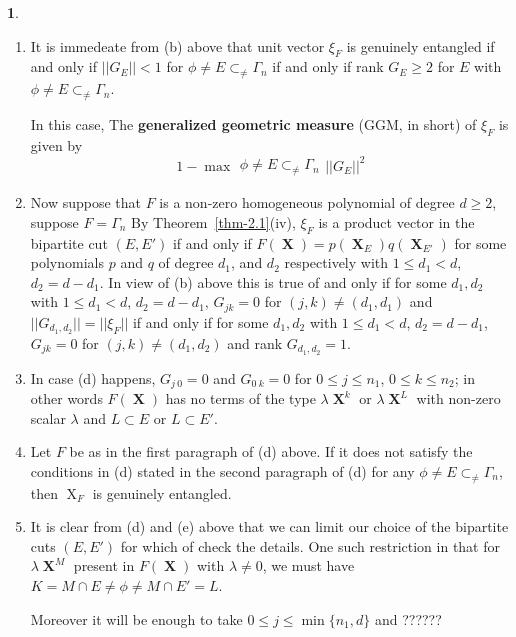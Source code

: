 \documentclass[a4paper,12pt]{article}
\DeclareMathOperator{\x}{\mathrm{X}}
\theoremstyle{definition}
\theoremstyle{underlinethm}
\theoremstyle{definition}
\newtheorem{subsubsec}{}[subsection]
\begin{document}
\begin{subsubsec}
\begin{enumerate}[label = (\alph*)]
\item It is immedeate from (b) above that unit vector $\xi_{F}$ is genuinely entangled if and only if $||G_{E}|| < 1 $ for $\phi \neq E \subset_{\neq} \Gamma_{n}$ if and only if rank $G_{E} \geq 2$ for $E$ with $\phi \neq E \subset_{\neq} \Gamma_{n}$.

In this case, The \textbf{generalized geometric measure} (GGM, in short) of $\xi_{F}$ is given by 
\begin{equation}
1 -\max\substack{\phi \neq E \subset_{\neq}\Gamma_{n}}|| G_{E}||^{2}\tag{4.20}\label{eq-4.20}
\end{equation} 

\item Now suppose that $F$ is a non-zero homogeneous polynomial of degree $d \geq 2$, suppose $F = \Gamma_{n}$ By Theorem~\ref{thm-2.1}(iv), $\xi_{F}$ is a product vector in the bipartite cut $(E, E')$ if and only if $F(\boldsymbol{\x}) = p(\boldsymbol{\x}_{E})q(\boldsymbol{\x}_{E'})$ for some polynomials $p$
 and $q$ of degree $d_{1}$, and $d_{2}$ respectively with $1 \leq d_{1} < d$, $d_{2}=d-d_{1}$. In view of (b) above this is true of and only if for some $d_{1}, d_{2}$ with $1 \leq d_{1} < d$, $d_{2}=d-d_{1}$, $G_{jk} =0$ for $(j,k) \neq (d_{1}, d_{1})$ and $||G_{d_{1}, d_{2}}||=|| \xi_{F}||$ if and only if for some $d_{1}, d_{2}$ with $1 \leq d_{1} < d$, $d_{2}=d-d_{1}$, $G_{jk}=0$ for $(j,k) \neq (d_{1}, d_{2})$ and rank $G_{d_{1},d_{2}}=1$.
 
 \item In case (d) happens, $G_{j~0} =0$ and $G_{0~k}=0$ for $0 \leq j \leq n_{1}$, $0 \leq k \leq n_{2}$; in other words $F(\boldsymbol{\x})$ has no terms of the type $\lambda \boldsymbol{\x}^{k}$ or $\lambda \boldsymbol{\x}^{L}$ with non-zero scalar $\lambda$ and $L \subset E$ or $L \subset E'$.
 
 \item Let $F$ be as in the first paragraph of (d) above. If it does not satisfy the conditions in (d) stated in the second paragraph of (d) for any $\phi \neq E \subset_{\neq} \Gamma_{n}$, then $\x_{F}$ is genuinely entangled.
 
 \item It is clear from (d) and (e) above that we can limit our choice of the bipartite cuts $(E, E')$ for which of check the details. One such restriction in that for $\lambda\boldsymbol{\x}^{M}$ present in $F(\boldsymbol{\x})$ with $\lambda\neq 0$, we must have $K = M \cap E \neq \phi \neq M \cap E' =L$. 
 
 Moreover it will be enough to take $0 \leq j \leq \min \{n_{1}, d\}$ and ??????

\end{enumerate}
\end{subsubsec}
\end{document}
